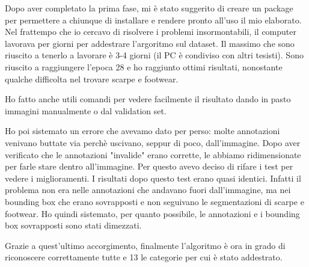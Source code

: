 Dopo aver completato la prima fase, mi è stato suggerito di creare un package per permettere a chiunque di installare e rendere pronto all'uso il mio elaborato.
Nel frattempo che io cercavo di risolvere i problemi insormontabili, il computer lavorava per giorni per addestrare l'argoritmo sul dataset. Il massimo che sono riuscito a tenerlo a lavorare è 3-4 giorni (il PC è condiviso con altri tesisti). Sono riuscito a raggiungere l'epoca 28 e ho raggiunto ottimi risultati, nonostante qualche difficolta nel trovare scarpe e footwear.

Ho fatto anche utili comandi per vedere facilmente il risultato dando in pasto immagini manualmente o dal validation set.

Ho poi sistemato un errore che avevamo dato per perso: molte annotazioni venivano buttate via perchè uscivano, seppur di poco, dall'immagine. Dopo aver verificato che le annotazioni "invalide" erano corrette, le abbiamo ridimensionate per farle stare dentro all'immagine. Per questo avevo deciso di rifare i test per vedere i miglioramenti. I risultati dopo questo test erano quasi identici. Infatti il problema non era nelle annotazioni che andavano fuori dall'immagine, ma nei bounding box che erano sovrapposti e non seguivano le segmentazioni di scarpe e footwear. Ho quindi sistemato, per quanto possibile, le annotazioni e i bounding box sovrapposti sono stati dimezzati.

Grazie a quest'ultimo accorgimento, finalmente l'algoritmo è ora in grado di riconoscere correttamente tutte e 13 le categorie per cui è stato addestrato.



